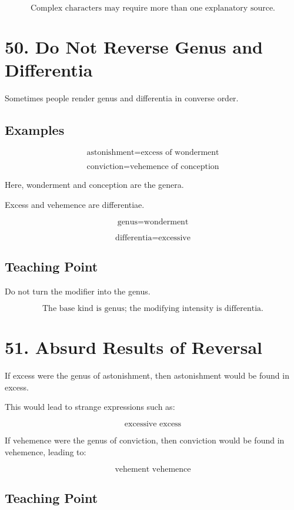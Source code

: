 \documentclass[12pt]{article}
\begin{document}
\[
\boxed{
\text{Complex characters may require more than one explanatory source.}
}
\]

\section*{50. Do Not Reverse Genus and Differentia}

Sometimes people render genus and differentia in converse order.

\subsection*{Examples}

\[
\text{astonishment} = \text{excess of wonderment}
\]

\[
\text{conviction} = \text{vehemence of conception}
\]

Here, wonderment and conception are the genera.

Excess and vehemence are differentiae.

\[
\text{genus} = \text{wonderment}
\]

\[
\text{differentia} = \text{excessive}
\]

\subsection*{Teaching Point}

Do not turn the modifier into the genus.

\[
\boxed{
\text{The base kind is genus; the modifying intensity is differentia.}
}
\]

\section*{51. Absurd Results of Reversal}

If excess were the genus of astonishment, then astonishment would be found in
excess.

This would lead to strange expressions such as:

\[
\text{excessive excess}
\]

If vehemence were the genus of conviction, then conviction would be found in
vehemence, leading to:

\[
\text{vehement vehemence}
\]

\subsection*{Teaching Point}
\end{document}
